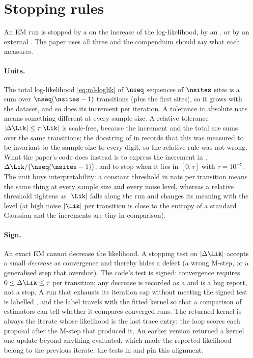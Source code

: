 \section{Stopping rules}

An EM run is stopped by a  on the increase of the log-likelihood, by an
, or by an external . The paper uses all three
and the compendium should say what each measures.

\paragraph{Units.} The total log-likelihood \cref{eq:ml-loglik} of $\nseq$ sequences of
$\nsites$ sites is a sum over $\nseq(\nsites-1)$ transitions (plus the first sites), so
it grows with the dataset, and so does its increment per iteration. A tolerance in
absolute nats means something different at every sample size. A relative tolerance
$|\Delta\Lik|\le\tau|\Lik|$ is scale-free, because the increment and the total are sums
over the same transitions; the docstring of  in
 records that this was measured to be invariant to the
sample size to every digit, so the relative rule was not wrong. What the paper's code
does instead is to express the increment in ,
$\Delta\Lik/\bigl(\nseq(\nsites-1)\bigr)$, and to stop when it lies in $[0,\tau]$ with
$\tau=10^{-9}$. The unit buys interpretability: a constant threshold in nats per
transition means the same thing at every sample size and every noise level, whereas a
relative threshold tightens as $|\Lik|$ falls along the run and changes its meaning
with the level (at high noise $|\Lik|$ per transition is close to the entropy of a
standard Gaussian and the increments are tiny in comparison).

\paragraph{Sign.} An exact EM cannot decrease the likelihood. A stopping test on
$|\Delta\Lik|$ accepts a small \emph{decrease} as convergence and thereby hides a defect
(a wrong M-step, or a generalised step that overshot). The code's test is signed:
convergence requires $0\le\Delta\Lik\le\tau$ per transition; any decrease is recorded as
a  and is a bug report, not a stop. A run that exhausts its
iteration cap without meeting the signed test is labelled , and the
label travels with the fitted kernel so that a comparison of estimators can tell
whether it compares converged runs. The returned kernel is always the iterate whose
likelihood is the last trace entry: the loop scores each proposal after the M-step that
produced it. An earlier version returned a kernel one update beyond anything evaluated,
which made the reported likelihood belong to the previous iterate; the tests in
 and  pin
this alignment.

